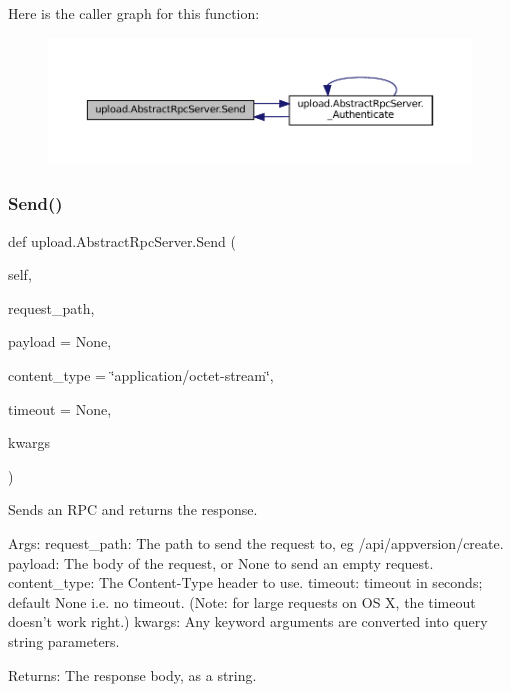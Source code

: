 Here is the caller graph for this function\+:
\nopagebreak
\begin{figure}[H]
\begin{center}
\leavevmode
\includegraphics[width=350pt]{classupload_1_1AbstractRpcServer_ac1b913f8bd00da4741c47ab49ea94cb5_icgraph}
\end{center}
\end{figure}
\mbox{\label{classupload_1_1AbstractRpcServer_ac1b913f8bd00da4741c47ab49ea94cb5}} 
\subsubsection{\texorpdfstring{Send()}{Send()}\hspace{0.1cm}{\footnotesize\ttfamily [2/2]}}
{\footnotesize\ttfamily def upload.\+Abstract\+Rpc\+Server.\+Send (\begin{DoxyParamCaption}\item[{}]{self,  }\item[{}]{request\+\_\+path,  }\item[{}]{payload = {\ttfamily None},  }\item[{}]{content\+\_\+type = {\ttfamily \char`\"{}application/octet-\/stream\char`\"{}},  }\item[{}]{timeout = {\ttfamily None},  }\item[{}]{kwargs }\end{DoxyParamCaption})}

\begin{DoxyVerb}Sends an RPC and returns the response.

Args:
  request_path: The path to send the request to, eg /api/appversion/create.
  payload: The body of the request, or None to send an empty request.
  content_type: The Content-Type header to use.
  timeout: timeout in seconds; default None i.e. no timeout.
(Note: for large requests on OS X, the timeout doesn't work right.)
  kwargs: Any keyword arguments are converted into query string parameters.

Returns:
  The response body, as a string.
\end{DoxyVerb}
 

